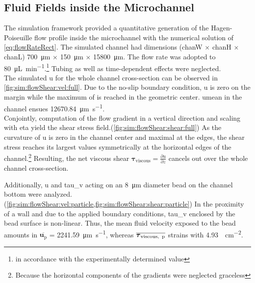 \subsection{Fluid Fields inside the Microchannel}
\label{sec:res:fluidSim}
The simulation framework provided a quantitative generation of the Hagen-Poiseuille flow profile inside the microchannel with the numerical solution of \cref{eq:flowRateRect}. The simulated channel had dimensions (\gls{chanW} $\times$ \gls{chanH} $\times$ \gls{chanL}) \SI{700}{\micro\meter} $\times$ \SI{150}{\micro\meter} $\times$ \SI{15800}{\micro\meter}. The flow rate was adopted to \SI{80}{\micro\liter\per\minute}.\footnote{in accordance with the experimentally determined value} Tubing as well as time-dependent effects were neglected. \\
The simulated \gls{u} for the whole channel cross-section can be observed in \cref{fig:sim:flowShear:vel:full}. Due to the no-slip boundary condition, \gls{u} is zero on the margin while the maximum of is reached in the geometric center. \gls{umean} in the channel ensues \SI{12670.84}{\micro\meter\per\second}.\\
Conjointly, computation of the flow gradient in a vertical direction and scaling with \gls{eta} yield the shear stress field.(\cref{fig:sim:flowShear:shear:full}) As the curvature of \gls{u} is zero in the channel center and maximal at the edges, the shear stress reaches its largest values symmetrically at the horizontal edges of the channel.\footnote{Because the horizontal components of the gradients were neglected graceless} Resulting, the net viscous shear $\boldsymbol{\tau}_\text{viscous} = \frac{\partial u}{\partial z}$ cancels out over the whole channel cross-section.

Additionally, \gls{u} and \gls{tau_v} acting on an \SI{8}{\micro\meter} diameter bead on the channel bottom were analyzed.(\cref{fig:sim:flowShear:vel:particle,fig:sim:flowShear:shear:particle}) In the proximity of a wall and due to the applied boundary conditions, \gls{tau_v} enclosed by the bead surface is non-linear. Thus, the mean fluid velocity exposed to the bead amounts in $\overline{\mathbf{u}_\text{p}}$ =  \SI{2241.59}{\micro\meter\per\second}, whereas  $\overline{\boldsymbol{\tau}_\text{viscous,\, p}}$ strains with \SI{4.93}{\dyne\per\square\centi\meter}.

